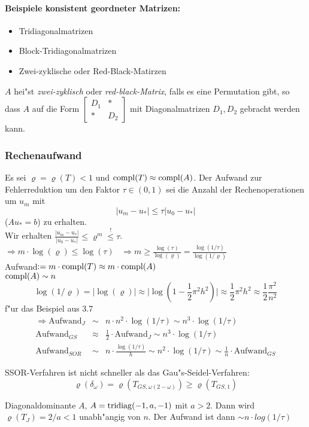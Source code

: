 \documentclass{scrartcl}
\begin{document}
\paragraph{Beispiele konsistent geordneter Matrizen:}
\begin{itemize}
\item Tridiagonalmatrizen 
\item Block-Tridiagonalmatrizen
\item Zwei-zyklische oder Red-Black-Matirzen
\end{itemize}
$A$ hei"st \emph{zwei-zyklisch} oder \emph{red-black-Matrix}, falls es eine Permutation gibt, so dass $A$ auf die Form $\left[ \begin{smallmatrix} D_1 & * \\ * & D_2 \end{smallmatrix} \right]$ mit Diagonalmatrizen $D_1, D_2$ gebracht werden kann.

\subsubsection{Rechenaufwand}
\begin{1aufz}
\item Es sei $\varrho = \varrho(T) < 1$ und $\mathrm{compl}(T) \approx \mathrm{compl}(A)$. Der Aufwand zur Fehlerreduktion um den Faktor $\tau \in (0,1)$ sei die Anzahl der Rechenoperationen um $u_m$ mit 
$$ \vert u_m - u_* \vert \leq \tau \vert u_0 - u_* \vert$$
($Au_* =b$) zu erhalten. \\
Wir erhalten $\frac{\vert u_m - u_* \vert }{\vert u_0 - u_* \vert } \leq \varrho^m \stackrel{!}{\leq} \tau$. \\
$\Rightarrow m \cdot \log(\varrho) \leq \log( \tau)$ \
$\Rightarrow m \geq \frac{ \log(\tau) }{\log( \varrho)} = \frac{ \log(1/ \tau) }{ \log (1 / \varrho)}$ \\
Aufwand$:= m \cdot \mathrm{compl}( T) \approx m \cdot \mathrm{compl} (A)$  \\
$\mathrm{compl}(A) \sim n$
$$ \log(1 / \varrho) = \vert \log (\varrho) \vert \approx \vert \log ( 1 - \frac{1}{2} \pi^2 h^2 ) \vert \approx \frac{1}{2} \pi^2 h^2 \approx \frac{1}{2} \frac{\pi^2}{n^2} $$
f"ur das Beispiel aus 3.7 \\
\begin{eqnarray*}
\Rightarrow \mathrm{Aufwand}_J & \sim & n \cdot n^2 \cdot \log (1/ \tau) \sim n^3 \cdot \log(1/\tau) \\
\mathrm{Aufwand}_{GS} & \approx & \frac{1}{2} \cdot \mathrm{Aufwand}_J \sim n^3 \cdot \log(1/\tau) \\
\mathrm{Aufwand}_{SOR} & \sim & n \cdot \frac{ \log(1/\tau) }{h} \sim n^2 \cdot \log(1/\tau) \sim \frac{1}{n} \cdot \mathrm{Aufwand}_{GS}
\end{eqnarray*}
\item SSOR-Verfahren ist nicht schneller als das Gau"s-Seidel-Verfahren:
$$ \varrho(\delta_\omega) = \varrho(T_{GS,\omega(2-\omega)}) \geq \varrho(T_{GS,1})$$
\item Diagonaldominante $A$, $A = \mathrm{tridiag}(-1,a,-1)$ mit $a > 2$. Dann wird $\varrho(T_J) = 2/a < 1$ unabh"angig von $n$. Der Aufwand ist dann $\sim n \cdot log(1/\tau)$
\end{1aufz}
\end{document}
